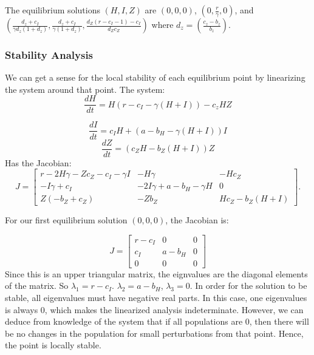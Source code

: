 \documentclass[
	12pt
]{article}
\begin{document}
The equilibrium solutions $(H,I,Z)$ are $(0,0,0)$, $(0,\frac{r}{\gamma},0)$, and $(\frac{d_z +c_I}{\gamma d_z(1+d_z)},  \frac{d_z +c_I}{\gamma (1+d_z)}, \frac{d_Z(r-c_I-1)-c_I}{d_Z c_Z})$ where $d_z = \left(\frac{c_z-b_z}{b_z}\right)$.
\subsubsection{Stability Analysis}
We can get a sense for the local stability of each equilibrium point by linearizing the system around that point. The system:
\begin{equation}
\frac{dH}{dt} = H(r - c_I-\gamma(H+I))-c_zHZ
\end{equation}

\begin{equation}
\frac{dI}{dt} = c_IH+(a-b_H-\gamma(H+I))I
\end{equation}
\begin{equation}
\frac{dZ}{dt} = (c_ZH-b_Z(H+I))Z
\end{equation}
Has the Jacobian:
\begin{equation}
J = \begin{bmatrix}
r-2H\gamma - Zc_Z - c_I - \gamma I & -H\gamma & -Hc_Z \\
-I\gamma + c_I & -2I\gamma + a - b_H - \gamma H & 0 \\
 Z(-b_Z + c_Z) & -Zb_Z & Hc_Z - b_Z(H + I)
\end{bmatrix}.
\end{equation}

For our first equilibrium solution $(0, 0, 0)$, the Jacobian is:

\begin{equation}
J=\begin{bmatrix} r-c_I& 0 & 0 \\ c_I & a - b_H & 0 \\ 0 & 0 & 0 \end{bmatrix}
\end{equation}
Since this is an upper triangular matrix, the eignvalues are the diagonal elements of the matrix. So $\lambda_1=r-c_I$. $\lambda_2=a-b_H$, $\lambda_3=0$. In order for the solution to be stable, all eigenvalues must have negative real parts. In this case, one eigenvalues is always $0$, which makes the linearized analysis indeterminate. However, we can deduce from knowledge of the system that if all populations are $0$, then there will be no changes in the population for small perturbations from that point. Hence, the point is locally stable.
\end{document}
